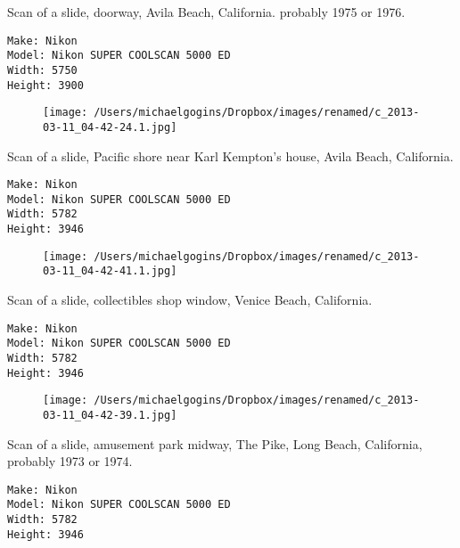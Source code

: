 \documentclass[11pt,letter,DIV=14,paper=landscape]{scrbook}
\begin{document}
\clearpage
\noindent Scan of a slide, doorway, Avila Beach, California. probably 1975 or 1976.
\noindent
\begin{lstlisting}
Make: Nikon
Model: Nikon SUPER COOLSCAN 5000 ED
Width: 5750
Height: 3900
\end{lstlisting}
\clearpage

\begin{figure}
\texttt{[image: /Users/michaelgogins/Dropbox/images/renamed/c\_2013-03-11\_04-42-24.1.jpg]}
\end{figure}
    
\clearpage
\noindent Scan of a slide, Pacific shore near Karl Kempton's house, Avila Beach, California.
\noindent
\begin{lstlisting}
Make: Nikon
Model: Nikon SUPER COOLSCAN 5000 ED
Width: 5782
Height: 3946
\end{lstlisting}
\clearpage

\begin{figure}
\texttt{[image: /Users/michaelgogins/Dropbox/images/renamed/c\_2013-03-11\_04-42-41.1.jpg]}
\end{figure}
    
\clearpage
\noindent Scan of a slide, collectibles shop window, Venice Beach, California.
\noindent
\begin{lstlisting}
Make: Nikon
Model: Nikon SUPER COOLSCAN 5000 ED
Width: 5782
Height: 3946
\end{lstlisting}
\clearpage

\begin{figure}
\texttt{[image: /Users/michaelgogins/Dropbox/images/renamed/c\_2013-03-11\_04-42-39.1.jpg]}
\end{figure}
    
\clearpage
\noindent Scan of a slide, amusement park midway, The Pike, Long Beach, California, probably 1973 or 1974.
\noindent
\begin{lstlisting}
Make: Nikon
Model: Nikon SUPER COOLSCAN 5000 ED
Width: 5782
Height: 3946
\end{lstlisting}
\clearpage
\end{document}
